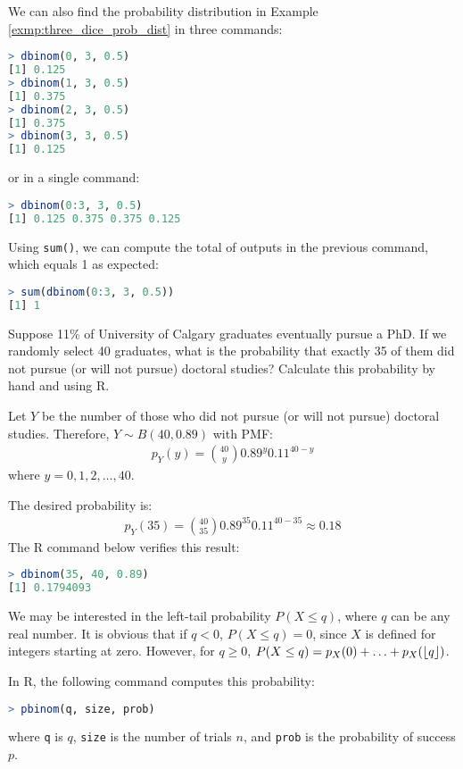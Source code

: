 We can also find the probability distribution in Example \autoref{exmp:three_dice_prob_dist} in three commands:
\begin{lstlisting}[language=R]
> dbinom(0, 3, 0.5)
[1] 0.125
> dbinom(1, 3, 0.5)
[1] 0.375
> dbinom(2, 3, 0.5)
[1] 0.375
> dbinom(3, 3, 0.5)
[1] 0.125
\end{lstlisting}
or in a single command:
\begin{lstlisting}[language=R]
> dbinom(0:3, 3, 0.5)
[1] 0.125 0.375 0.375 0.125
\end{lstlisting}
Using \verb|sum()|, we can compute the total of outputs in the previous command, which equals 1 as expected:
\begin{lstlisting}[language=R]
> sum(dbinom(0:3, 3, 0.5))
[1] 1
\end{lstlisting}
\begin{exmp}\label{exmp:ucalgary}
    Suppose 11\% of University of Calgary graduates eventually pursue a PhD.
    If we randomly select 40 graduates,
    what is the probability that exactly 35 of them did not pursue (or will not pursue) doctoral studies?
    Calculate this probability by hand and using R.
\end{exmp}
\begin{solution}
    Let \( Y \) be the number of those who did not pursue (or will not pursue) doctoral studies.
    Therefore, \( Y \sim B(40, 0.89) \) with PMF:
    \begin{gather*}
        p_{Y}(y) = \binom{40}{y} 0.89^{y}0.11^{40 - y}
    \end{gather*}
    where \( y = 0, 1, 2, \ldots, 40 \).

    The desired probability is:
    \begin{gather*}
        p_{Y}(35) = \binom{40}{35} 0.89^{35}0.11^{40 - 35} \approx 0.18
    \end{gather*}
    The R command below verifies this result:
    \begin{lstlisting}[language=R]
> dbinom(35, 40, 0.89)
[1] 0.1794093
    \end{lstlisting}
\end{solution}
We may be interested in the left-tail probability \( P(X \leq q) \), where \( q \) can be any real number.
It is obvious that if \( q < 0 \), \( P(X \leq q) = 0 \), since \( X \) is defined for integers starting at zero.
However, for \( q \geq 0\), \( P(X \leq q) = p_{X}(0) + \ldots + p_{X}(\lfloor q\rfloor) \).

In R, the following command computes this probability:
\begin{lstlisting}[language=R]
> pbinom(q, size, prob)
\end{lstlisting}
where \verb|q| is \( q \), \verb|size| is the number of trials \( n \), and \verb|prob| is the probability of success \( p \).

